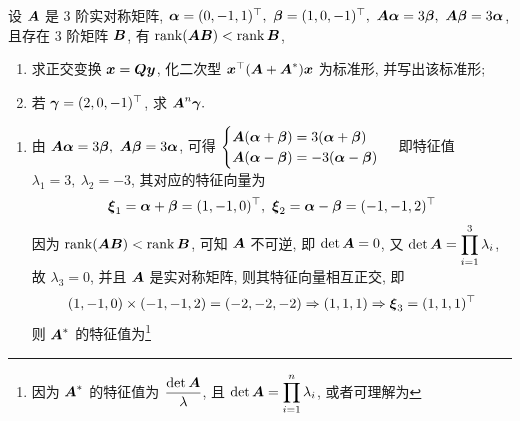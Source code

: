 \begin{example}
    设 $\vb*{A}$ 是 3 阶实对称矩阵, $\vb*{\alpha}=(0,-1,1)^\top,~\vb*{\beta}=(1,0,-1)^\top,~\vb*{A\alpha}=3\vb*{\beta},~\vb*{A\beta}=3\vb*{\alpha}$, 且存在 3 阶矩阵 $\vb*{B}$, 有 $\rank(\vb*{AB})<\rank\vb*{B}$, 
    \begin{enumerate}[label=(\arabic{*})]
        \item 求正交变换 $\vb*{x}=\vb*{Qy}$, 化二次型 $\vb*{x}^\top\qty(\vb*{A}+\vb*{A}^*)\vb*{x}$ 为标准形, 并写出该标准形;
        \item 若 $\vb*{\gamma}=(2,0,-1)^\top$, 求 $\vb*{A}^n\vb*{\gamma}.$
    \end{enumerate}
\end{example}
\begin{solution}
    \begin{enumerate}[label=(\arabic{*})]
        \item 由 $\vb*{A\alpha}=3\vb*{\beta},~\vb*{A\beta}=3\vb*{\alpha}$, 可得 $\begin{cases}
                      \vb*{A}(\vb*{\alpha}+\vb*{\beta})=3(\vb*{\alpha}+\vb*{\beta}) \\
                      \vb*{A}(\vb*{\alpha}-\vb*{\beta})=-3(\vb*{\alpha}-\vb*{\beta})
                  \end{cases}$ 即特征值 $\lambda_1=3,~\lambda_2=-3$, 其对应的特征向量为 $$\vb*{\xi}_1=\vb*{\alpha}+\vb*{\beta}=(1,-1,0)^\top,~\vb*{\xi}_2=\vb*{\alpha}-\vb*{\beta}=(-1,-1,2)^\top$$
              因为 $\rank(\vb*{AB})<\rank\vb*{B}$, 可知 $\vb*{A}$ 不可逆, 即 $\det\vb*{A}=0$, 又 $\det\vb*{A}=\displaystyle\prod_{i=1}^{3}\lambda_i$, 故 $\lambda_3=0$, 并且 $\vb*{A}$ 是实对称矩阵, 则其特征向量相互正交, 即
              $$(1,-1,0)\times(-1,-1,2)=(-2,-2,-2)\Rightarrow (1,1,1)\Rightarrow \vb*{\xi}_3=(1,1,1)^\top$$
              则 $\vb*{A}^*$ 的特征值为\footnote{因为 $\vb*{A}^*$ 的特征值为 $\dfrac{\det\vb*{A}}{\lambda}$, 且 $\det\vb*{A}=\displaystyle\prod_{i=1}^{n}\lambda_i$, 或者可理解为 }
\end{enumerate}
\end{solution}
